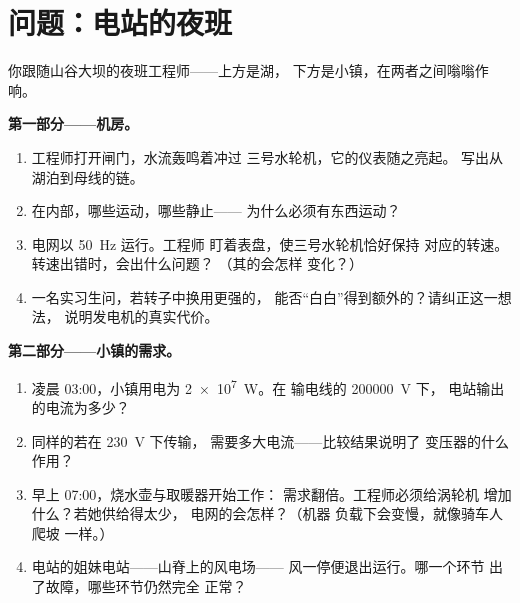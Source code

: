 \section{问题：电站的夜班}

\begin{problem}\label{pb:g9:alternator:1}
你跟随山谷大坝的夜班工程师——上方是湖，
下方是小镇，在两者之间嗡嗡作响。

\medskip\noindent\textbf{第一部分——机房。}
\begin{enumerate}
  \item 工程师打开闸门，水流轰鸣着冲过
        三号水轮机，它的仪表随之亮起。
        写出从湖泊到母线的链。
  \item 在内部，哪些运动，哪些静止——
        为什么必须有东西运动？
  \item 电网以 \qty{50}{Hz} 运行。工程师
        盯着表盘，使三号水轮机恰好保持
        对应的转速。转速出错时，会出什么问题？
        （其的会怎样
        变化？）
  \item 一名实习生问，若转子中换用更强的，
        能否“白白”得到额外的？请纠正这一想法，
        说明发电机的真实代价。
\end{enumerate}

\medskip\noindent\textbf{第二部分——小镇的需求。}
\begin{enumerate}[resume]
  \item 凌晨 03:00，小镇用电为 \qty{2e7}{W}。在
        输电线的 \qty{200000}{V} 下，
        电站输出的电流为多少？
  \item 同样的若在 \qty{230}{V} 下传输，
        需要多大电流——比较结果说明了
        变压器的什么作用？
  \item 早上 07:00，烧水壶与取暖器开始工作：
        需求翻倍。工程师必须给涡轮机
        增加什么？若她供给得太少，
        电网的会怎样？（机器
        负载下会变慢，就像骑车人爬坡
        一样。）
  \item 电站的姐妹电站——山脊上的风电场——
        风一停便退出运行。哪一个环节
        出了故障，哪些环节仍然完全
        正常？
\end{enumerate}


\end{problem}
